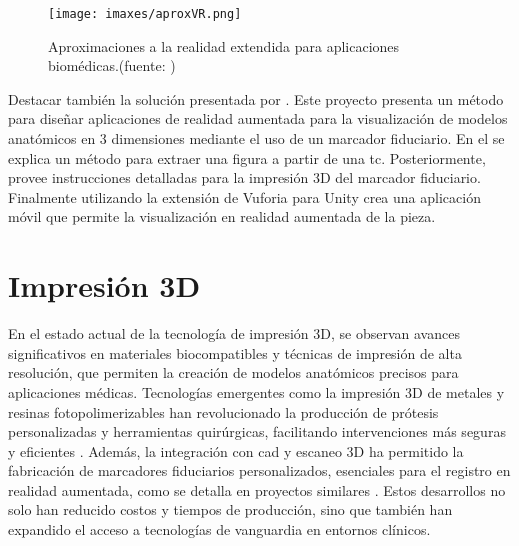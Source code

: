 \begin{figure}
  \centering
  \texttt{[image: imaxes/aproxVR.png]}
  \caption{Aproximaciones a la realidad extendida para aplicaciones biomédicas.(fuente: \cite{Venkatesan2021})}
  \label{fig:vrAproximations}
\end{figure}

Destacar también la solución presentada por \cite{MoretaMartinez2020}. Este proyecto presenta un método para diseñar aplicaciones de realidad aumentada para la visualización de modelos anatómicos en 3 dimensiones mediante el uso de un marcador fiduciario. En el se explica un método para extraer una figura a partir de una \acrshort{tc}. Posteriormente, provee instrucciones detalladas para la impresión 3D del marcador fiduciario. Finalmente utilizando la extensión de Vuforia para Unity crea una aplicación móvil que permite la visualización en realidad aumentada de la pieza. 

\section{Impresión 3D}
En el estado actual de la tecnología de impresión 3D, se observan avances significativos en materiales biocompatibles y técnicas de impresión de alta resolución, que permiten la creación de modelos anatómicos precisos para aplicaciones médicas. Tecnologías emergentes como la impresión 3D de metales y resinas fotopolimerizables han revolucionado la producción de prótesis personalizadas y herramientas quirúrgicas, facilitando intervenciones más seguras y eficientes \cite{Gonzalez_Alvarez_2021}. Además, la integración con \acrfull{cad} y escaneo 3D ha permitido la fabricación de marcadores fiduciarios personalizados, esenciales para el registro en realidad aumentada, como se detalla en proyectos similares \cite{MoretaMartinez2020}. Estos desarrollos no solo han reducido costos y tiempos de producción, sino que también han expandido el acceso a tecnologías de vanguardia en entornos clínicos.

